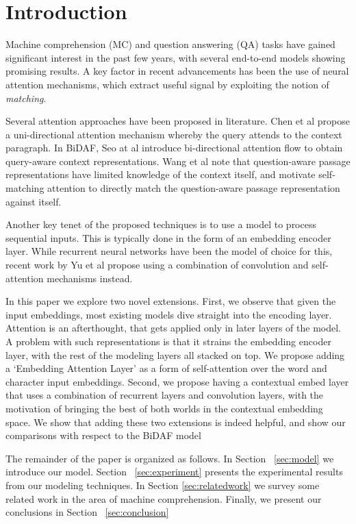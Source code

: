 \section{Introduction}
\label{sec:introduction}

Machine comprehension (MC) and question answering (QA) tasks have gained significant interest in the past few years, with several end-to-end models showing promising results. A key factor in recent advancements has been the use of neural attention mechanisms, which extract useful signal by exploiting the notion of \textit{matching}. 

Several attention approaches have been proposed in literature. Chen et al \cite{chen2016thorough} propose a uni-directional attention mechanism whereby the query attends to the context paragraph. In BiDAF, Seo at al \cite{seo2016bidirectional} introduce bi-directional attention flow to obtain query-aware context representations. Wang et al \cite{wang2017gated} note that question-aware passage representations have limited knowledge of the context itself, and motivate self-matching attention to directly match the question-aware passage representation against itself.
 
Another key tenet of the proposed techniques is to use a model to process sequential inputs. This is typically done in the form of an embedding encoder layer. While recurrent neural networks have been the model of choice for this, recent work by Yu et al \cite{yu2018qanet} propose using a combination of convolution and self-attention mechanisms instead. 

In this paper we explore two novel extensions. First, we observe that given the input embeddings, most existing models dive straight into the encoding layer. Attention is an afterthought, that gets applied only in later layers of the model. A problem with such representations is that it strains the embedding encoder layer, with the rest of the modeling layers all stacked on top. We propose adding a `Embedding Attention Layer' as a form of self-attention over the word and character input embeddings. Second, we propose having a contextual embed layer that uses a combination of recurrent layers and convolution layers, with the motivation of bringing the best of both worlds in the contextual embedding space. We show that adding these two extensions is indeed helpful, and show our comparisons with respect to the BiDAF model \cite{seo2016bidirectional}

The remainder of the paper is organized as follows. In Section ~\ref{sec:model} we introduce our model. Section ~\ref{sec:experiment} presents the experimental results from our modeling techniques. In Section \ref{sec:relatedwork} we survey some related work in the area of machine comprehension. Finally, we present our conclusions in Section ~\ref{sec:conclusion}

 






